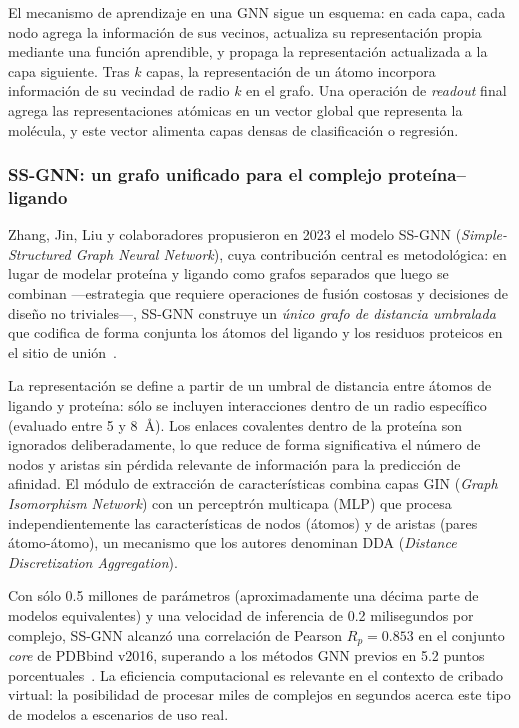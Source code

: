 El mecanismo de aprendizaje en una GNN sigue un esquema: en cada capa, cada nodo agrega la información de sus vecinos, actualiza su representación propia mediante una función aprendible, y propaga la representación actualizada a la capa siguiente. Tras $k$ capas, la representación de un átomo incorpora información de su vecindad de radio $k$ en el grafo. Una operación de \emph{readout} final agrega las representaciones atómicas en un vector global que representa la molécula, y este vector alimenta capas densas de clasificación o regresión.


\subsubsection{SS-GNN: un grafo unificado para el complejo proteína--ligando}
 
Zhang, Jin, Liu y colaboradores propusieron en 2023 el modelo SS-GNN (\textit{Simple-Structured Graph Neural Network}), cuya contribución central es metodológica: en lugar de modelar proteína y ligando como grafos separados que luego se combinan —estrategia que requiere operaciones de fusión costosas y decisiones de diseño no triviales—, SS-GNN construye un \emph{único grafo de distancia umbralada} que codifica de forma conjunta los átomos del ligando y los residuos proteicos en el sitio de unión~\cite{zhang_ssgnn_2023}.
 
La representación se define a partir de un umbral de distancia entre átomos de ligando y proteína: sólo se incluyen interacciones dentro de un radio específico (evaluado entre 5 y 8~Å). Los enlaces covalentes dentro de la proteína son ignorados deliberadamente, lo que reduce de forma significativa el número de nodos y aristas sin pérdida relevante
de información para la predicción de afinidad. El módulo de extracción de características combina capas GIN (\textit{Graph Isomorphism Network}) con un perceptrón multicapa (MLP) que procesa independientemente las características de nodos (átomos) y de aristas (pares átomo-átomo), un mecanismo que los autores denominan DDA (\textit{Distance Discretization Aggregation}).
 
Con sólo 0.5 millones de parámetros (aproximadamente una décima parte de modelos equivalentes) y una velocidad de inferencia de 0.2 milisegundos por complejo, SS-GNN alcanzó una correlación de Pearson $R_p = 0.853$ en el conjunto \textit{core} de PDBbind v2016, superando a los métodos GNN previos en 5.2 puntos porcentuales~\cite{zhang_ssgnn_2023}. La eficiencia computacional es relevante en el contexto de cribado virtual: la posibilidad de procesar miles de complejos en segundos acerca este tipo de modelos a escenarios de uso real.
 
